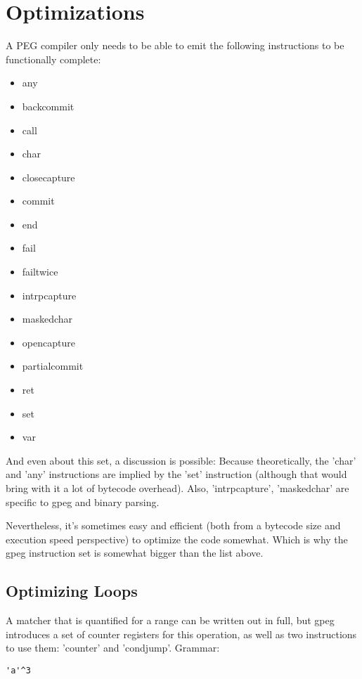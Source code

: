 \section{Optimizations}

A PEG compiler only needs to be able to emit the following instructions to be
functionally complete:

\begin{itemize}
\item any
\item backcommit
\item call
\item char
\item closecapture
\item commit
\item end
\item fail
\item failtwice
\item intrpcapture
\item maskedchar
\item opencapture
\item partialcommit
\item ret
\item set
\item var
\end{itemize}

And even about this set, a discussion is possible:
Because theoretically, the 'char' and 'any' instructions are implied by
the 'set' instruction
(although that would bring with it a lot of bytecode overhead).
Also, 'intrpcapture', 'maskedchar' are specific to gpeg and
binary parsing.

Nevertheless, it's sometimes easy and efficient (both from a bytecode
size and execution speed perspective) to optimize the code somewhat.
Which is why the gpeg instruction set is somewhat bigger than the
list above.

\subsection{Optimizing Loops}
A matcher that is quantified for a range can be written out in
full, but gpeg introduces a set of counter registers for this operation,
as well as two instructions to use them: 'counter' and 'condjump'.
Grammar:

\begin{myquote}
\begin{verbatim}
'a'^3
\end{verbatim}
\end{myquote}

